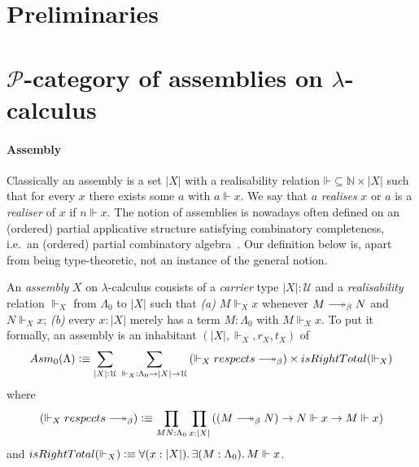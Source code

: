 \documentclass[a4paper,UKenglish,numberwithinsect,cleveref,thm-restate]{lipics-v2021}
\newcommand{\PP}{\mathscr{P}}
\newcommand{\Asm}{\mathsf{Asm}}
\newcommand{\defeq}{\vcentcolon\equiv}
\newcommand{\Univ}{\mathcal{U}}
\DeclareRobustCommand\longtwoheadrightarrow{\relbar\joinrel\twoheadrightarrow}
\newcommand{\reduce}{\longtwoheadrightarrow_{\beta}}
\theoremstyle{plain}
\begin{document}
\section{Preliminaries}\label{sec:preliminaries}

\ltnote{$\PP$-category}

\section{\texorpdfstring{$\PP$}{P}-category of assemblies on \texorpdfstring{$\lambda$}{λ}-calculus}\label{sec:assemblies}

\paragraph*{Assembly}
Classically an assembly is a set $|X|$ with a realisability relation $\mathord{\Vdash} \subseteq \mathbb{N} \times |X|$ such that for every $x$ there exists some $a$ with $a \Vdash x$. We say that $a$ \emph{realises} $x$ or $a$ is a \emph{realiser} of $x$ if $n \Vdash x$.
The notion of assemblies is nowadays often defined on an (ordered) partial applicative structure satisfying combinatory completeness, i.e.\ an (ordered) partial combinatory algebra~\cite{Oosten2008}.
Our definition below is, apart from being type-theoretic, not an instance of the general notion.
\begin{definition}\label{def:assembly}
  An \emph{assembly} $X$ on $\lambda$-calculus consists of a \emph{carrier} type $|X| : \Univ$ and a \emph{realisability} relation ${\Vdash_X}$ from $\Lambda_0$ to $|X|$ such that
  \emph{(a)} $M \Vdash_X x$ whenever $M \reduce N$ and $N \Vdash_X x$;
  \emph{(b)} every $x : |X|$ merely has a term $M : \Lambda_0$ with $M \Vdash_X x$. 
  To put it formally, an assembly is an inhabitant $(|X|, \Vdash_X, r_X, t_X)$ of
  \[
    \Asm_0(\Lambda) \defeq \sum_{|X| : \Univ}\;\sum_{\mathord{\Vdash_X}:\Lambda_0 \to |X| \to \Univ} 
    \left(\mathord{\Vdash_X}\;\mathsf{respects}\;\mathord{\reduce}\right)
      \times \mathsf{isRightTotal}({\Vdash_X})
  \]
  where 
  \[
    \left(\mathord{\Vdash_X}\;\mathsf{respects}\;\mathord{\reduce}\right) \defeq
    \prod_{M N : \Lambda_0} \prod_{x : |X|} \left( \left(M \reduce N\right) \to N \Vdash x \to M \Vdash x \right)
  \]
  and $\mathsf{isRightTotal}(\Vdash_X) \defeq \forall (x : |X|).\, \exists (M : \Lambda_0).\, M \Vdash x$.
\end{definition}
\end{document}
